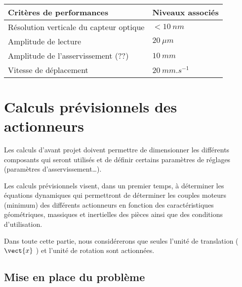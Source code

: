 \ifprof
\begin{corrige} ~\\

\begin{center}
\begin{tabular}{ll}
\hline
\textbf{Critères de performances} & \textbf{Niveaux associés} \\ \hline
Résolution verticale du capteur optique & $< \SI{10}{nm}$ \\ 
Amplitude de lecture & $\SI{20}{\mu m}$ \\ 
Amplitude de l'asservissement (??) & $\SI{10}{mm}$ \\ 
Vitesse de déplacement & $\SI{20}{mm.s^{-1}}$\\ \hline
\end{tabular}
\end{center}
\end{corrige}
\else
\fi


\section{Calculs prévisionnels des actionneurs \label{sec:3}}

\ifprof
\else
Les calculs d’avant projet doivent permettre de dimensionner les différents composants qui seront utilisés
et de définir certains paramètres de réglages (paramètres d’asservissement…).

Les calculs prévisionnels visent, dans un premier temps, à déterminer les équations dynamiques qui
permettront de déterminer les couples moteurs (minimum) des différents actionneurs en fonction des
caractéristiques géométriques, massiques et inertielles des pièces ainsi que des conditions d’utilisation.

Dans toute cette partie, nous considérerons que seules l'unité de translation ($\vect{x}$ ) et l’unité de rotation sont
actionnées.
\fi

\subsection{Mise en place du problème}

